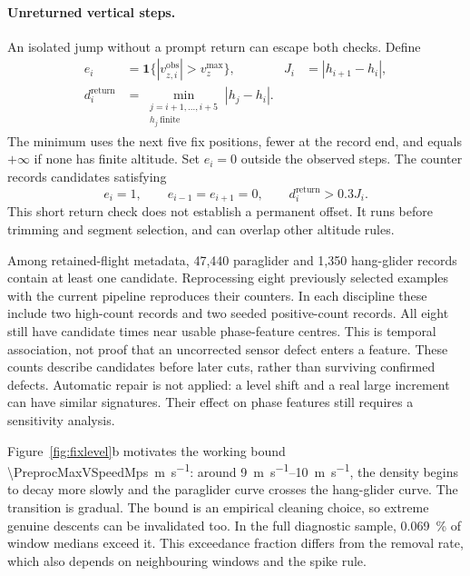 \begin{revblock}
\paragraph{Unreturned vertical steps.}
An isolated jump without a prompt return can escape both checks. Define
\begin{align}
 e_i&=\mathbf1\{|v_{z,i}^{\mathrm{obs}}|>v_z^{\max}\},
 &J_i&=|h_{i+1}-h_i|,\\
 d_i^{\mathrm{return}}&=
 \min_{\substack{j=i+1,\ldots,i+5\\h_j\ \mathrm{finite}}}|h_j-h_i|.
\end{align}
The minimum uses the next five fix positions, fewer at the record end,
and equals $+\infty$ if none has finite altitude. Set $e_i=0$ outside the observed
steps. The counter
 records candidates satisfying
\begin{equation}
 e_i=1,\qquad e_{i-1}=e_{i+1}=0,\qquad
 d_i^{\mathrm{return}}>0.3J_i.
 \label{eq:level-shift-candidate}
\end{equation}
This short return check does not establish a permanent offset. It runs before
trimming and segment selection, and can overlap other altitude rules.

Among retained-flight metadata, 47,440 paraglider and 1,350 hang-glider records
contain at least one candidate. Reprocessing eight previously selected examples
with the current pipeline reproduces their counters. In each discipline these
include two high-count records and two seeded positive-count records. All eight
still have candidate times near usable phase-feature centres. This is temporal
association, not proof that an uncorrected sensor defect enters a feature. These counts describe candidates before
later cuts, rather than surviving confirmed defects. Automatic repair is not applied:
a level shift and a real large increment can have similar signatures. Their effect
on phase features still requires a sensitivity analysis.

Figure~\ref{fig:fixlevel}b motivates the working bound
\SI{\PreprocMaxVSpeedMps}{\metre\per\second}: around
\SIrange{9}{10}{\metre\per\second}, the density begins to decay more slowly and
the paraglider curve crosses the hang-glider curve. The transition is gradual.
The bound is an empirical cleaning choice, so extreme genuine descents can be
invalidated too. In the full diagnostic sample, \SI{0.069}{\percent} of window
medians exceed it. This exceedance fraction differs from the removal rate, which
also depends on neighbouring windows and the spike rule.

\end{revblock}

